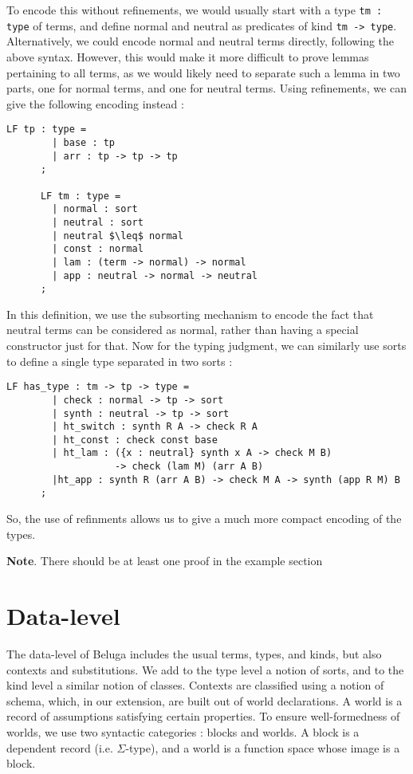 \documentclass[letterpaper, 11pt]{article}
\begin{document}
    To encode this without refinements, we would usually start with a type \texttt{tm : type} of terms, and define normal and neutral as predicates of kind 
    \texttt{tm -> type}.  Alternatively, we could encode normal and neutral terms directly, following the above syntax.  However, this would make it more
    difficult to prove lemmas pertaining to all terms, as we would likely need to separate such a lemma in two parts, one for normal terms, and one for 
    neutral terms.  Using refinements, we can give the following encoding instead :

    \begin{lstlisting}[mathescape, basicstyle=\fontfamily{lmvtt}\selectfont]
      LF tp : type = 
        | base : tp
        | arr : tp -> tp -> tp
      ;

      LF tm : type =
        | normal : sort
        | neutral : sort
        | neutral $\leq$ normal
        | const : normal
        | lam : (term -> normal) -> normal
        | app : neutral -> normal -> neutral
      ;
    \end{lstlisting}

    In this definition, we use the subsorting mechanism to encode the fact that neutral terms can be considered as normal, rather than having a special 
    constructor just for that.  Now for the typing judgment, we can similarly use sorts to define a single type separated in two sorts :

    \begin{lstlisting}[mathescape, basicstyle=\fontfamily{lmvtt}\selectfont]
      LF has_type : tm -> tp -> type =
        | check : normal -> tp -> sort
        | synth : neutral -> tp -> sort
        | ht_switch : synth R A -> check R A
        | ht_const : check const base
        | ht_lam : ({x : neutral} synth x A -> check M B) 
                   -> check (lam M) (arr A B)
        |ht_app : synth R (arr A B) -> check M A -> synth (app R M) B
      ;
    \end{lstlisting}

    So, the use of refinments allows us to give a much more compact encoding of the types.


    \textbf{Note}.  There should be at least one proof in the example section

    \section{Data-level}
    The data-level of Beluga includes the usual terms, types, and kinds, but also contexts and substitutions.  We add to the type level a notion of sorts,
    and to the kind level a similar notion of classes.  Contexts are classified using a notion of schema, which, in our extension, are built out of
    world declarations.  A world is a record of assumptions satisfying certain properties.  To ensure well-formedness of worlds, we use two syntactic
    categories : blocks and worlds.  A block is a dependent record (i.e. $\Sigma$-type), and a world is a function space whose image is a block.
\end{document}
